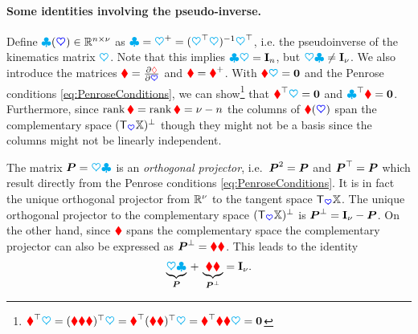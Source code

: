 \paragraph{Some identities involving the pseudo-inverse.}
Define $\kinBasisMat(\sysCoord) \in \RealNum^{\dimConfigSpace\times\numCoord}$ as $\kinBasisMat = \kinMat^+ = (\kinMat^\top \kinMat)^{-1} \kinMat^\top$, i.e. the pseudoinverse of the kinematics matrix $\kinMat$.
Note that this implies $\kinBasisMat \kinMat = \idMat[\dimConfigSpace]$, but $\kinMat \kinBasisMat \neq \idMat[\numCoord]$.
We also introduce the matrices $\geoConstraintMat = \pdiff[\geoConstraint]{\sysCoord}$ and $\InvGeoConstraintMat = \geoConstraintMat^+$.
With $\geoConstraintMat\kinMat = \mat{0}$ and the Penrose conditions \eqref{eq:PenroseConditions}, we can show\footnote{$\InvGeoConstraintMat^\top \kinMat = (\InvGeoConstraintMat \geoConstraintMat \InvGeoConstraintMat)^\top \kinMat = \InvGeoConstraintMat^\top (\InvGeoConstraintMat \geoConstraintMat)^\top \kinMat = \InvGeoConstraintMat^\top \InvGeoConstraintMat \geoConstraintMat \kinMat = \mat{0}$} that $\InvGeoConstraintMat^\top \kinMat = \mat{0}$ and $\kinBasisMat^\top \geoConstraintMat = \mat{0}$.
Furthermore, since $\rank\InvGeoConstraintMat = \rank\geoConstraintMat = \numCoord - \dimConfigSpace$ the columns of $\InvGeoConstraintMat(\sysCoord)$ span the complementary space $(\Tangent[\sysCoord]\configSpace)^\bot$ though they might not be a basis since the columns might not be linearly independent.

The matrix $\mat{P} = \kinMat \kinBasisMat$ is an \textit{orthogonal projector}, i.e.\ $\mat{P}^2 = \mat{P}$ and $\mat{P}^\top = \mat{P}$ which result directly from the Penrose conditions \eqref{eq:PenroseConditions}.
It is in fact the unique orthogonal projector from $\RealNum^\nu$ to the tangent space $\Tangent[\sysCoord]\configSpace$.
The unique orthogonal projector to the complementary space $(\Tangent[\sysCoord]\configSpace)^\bot$ is $\mat{P}^\bot = \idMat[\numCoord] - \mat{P}$.
On the other hand, since $\InvGeoConstraintMat$ spans the complementary space the complementary projector can also be expressed as $\mat{P}^\bot = \InvGeoConstraintMat \geoConstraintMat$.
This leads to the identity
\begin{align}\label{eq:ProjectionIdentity}
 \underbrace{\kinMat \kinBasisMat}_{\mat{P}} \, + \, \underbrace{\InvGeoConstraintMat \geoConstraintMat}_{\mat{P}^\bot} = \idMat[\numCoord].
\end{align}

